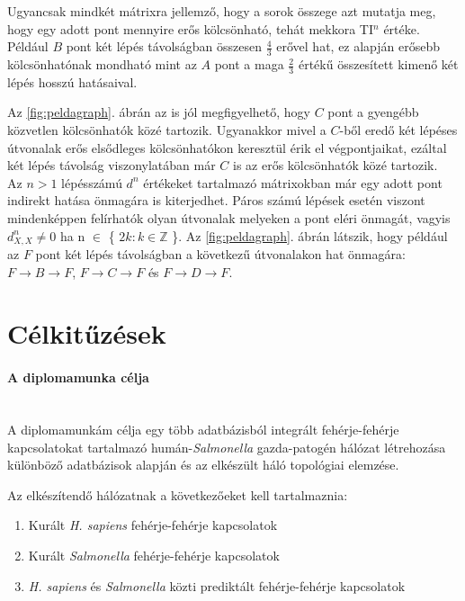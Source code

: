 \documentclass[a4paper,12pt]{article}
\begin{document}
	Ugyancsak mindkét mátrixra jellemző, hogy a sorok összege azt mutatja meg, hogy egy adott pont mennyire erős kölcsönható, tehát mekkora TI$^n$ értéke. Például $B$ pont két lépés távolságban összesen $\frac{4}{3}$ erővel hat, ez alapján erősebb kölcsönhatónak mondható mint az $A$ pont a maga $\frac{2}{3}$ értékű összesített kimenő két lépés hosszú hatásaival. \cite{ti}
	
	Az \ref{fig:peldagraph}. ábrán az is jól megfigyelhető, hogy $C$ pont a gyengébb közvetlen kölcsönhatók közé tartozik. Ugyanakkor mivel a $C$-ből eredő két lépéses útvonalak erős elsődleges kölcsönhatókon keresztül érik el végpontjaikat, ezáltal két lépés távolság viszonylatában már $C$ is az erős kölcsönhatók közé tartozik. \\
	\indent Az $n > 1$ lépésszámú $d^n$ értékeket tartalmazó mátrixokban már egy adott pont indirekt hatása önmagára is kiterjedhet. Páros számú lépések esetén viszont mindenképpen felírhatók olyan útvonalak melyeken a pont eléri önmagát, \cite{ti} vagyis $d^n_{X,X} \neq 0$ ha n $\in$ \{ $2k :  k \in \mathbb{Z}$ \}. Az \ref{fig:peldagraph}. ábrán látszik, hogy például az $F$ pont két lépés távolságban a következű útvonalakon hat önmagára: $F \rightarrow B \rightarrow F$, $F \rightarrow C \rightarrow F$ és  $F \rightarrow D \rightarrow F$.
 	 \pagebreak

\section{Célkitűzések}
	\paragraph{A diplomamunka célja} \mbox{}\\
	A diplomamunkám célja egy több adatbázisból integrált fehérje-fehérje kapcsolatokat tartalmazó humán-\textit{Salmonella} gazda-patogén hálózat létrehozása különböző adatbázisok alapján és az elkészült háló topológiai elemzése.
	
	
	Az elkészítendő hálózatnak a következőeket kell tartalmaznia:  
	\begin{enumerate}
			\item Kurált \textit{H. sapiens} fehérje-fehérje kapcsolatok
			\item Kurált \textit{Salmonella} fehérje-fehérje kapcsolatok
			\item \textit{H. sapiens} és \textit{Salmonella} közti prediktált fehérje-fehérje kapcsolatok
	\end{enumerate}
	
\end{document}
